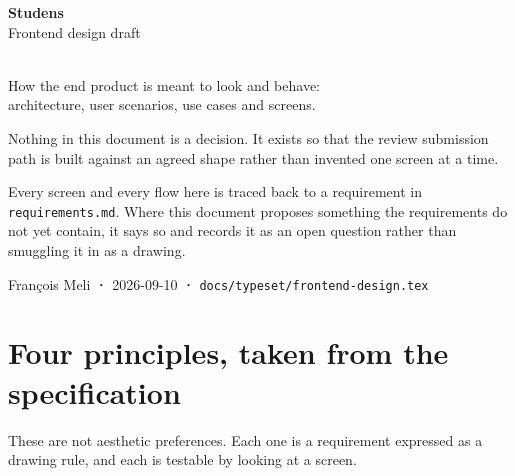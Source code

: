 \documentclass[11pt,a4paper]{article}
\begin{document}
\begin{titlepage}
\centering
\vspace*{2.2cm}
{\sffamily\fontsize{34}{40}\selectfont\bfseries\color{studens}Studens}\\[2mm]
{\sffamily\large\color{muted}Frontend design draft}\\[10mm]
\\[10mm]
{\sffamily\normalsize How the end product is meant to look and behave:\\
architecture, user scenarios, use cases and screens.}\\[16mm]

\begin{tcolorbox}[width=0.86\textwidth,colback=ochrelt,colframe=ochre,
  arc=2pt,fonttitle=\sffamily\bfseries,title={Status: proposed, not decided}]
\sffamily\small
Nothing in this document is a decision. It exists so that the review
submission path is built against an agreed shape rather than invented one
screen at a time.

Every screen and every flow here is traced back to a requirement in
\texttt{requirements.md}. Where this document proposes something the
requirements do not yet contain, it says so and records it as an open question
rather than smuggling it in as a drawing.
\end{tcolorbox}

\vfill
{\sffamily\footnotesize\color{muted}François Meli \textbf{·} 2026-09-10 \textbf{·} \texttt{docs/typeset/frontend-design.tex}}
\end{titlepage}

\tableofcontents
\newpage

\section{Four principles, taken from the specification}

These are not aesthetic preferences. Each one is a requirement expressed as a
drawing rule, and each is testable by looking at a screen.
\end{document}
